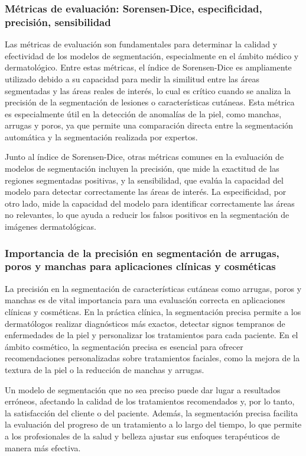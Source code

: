 \subsubsection{Métricas de evaluación: Sorensen-Dice, especificidad, precisión, sensibilidad}
Las métricas de evaluación son fundamentales para determinar la calidad y efectividad de los modelos de segmentación, especialmente en el ámbito médico y dermatológico. Entre estas métricas, el índice de Sorensen-Dice es ampliamente utilizado debido a su capacidad para medir la similitud entre las áreas segmentadas y las áreas reales de interés, lo cual es crítico cuando se analiza la precisión de la segmentación de lesiones o características cutáneas. Esta métrica es especialmente útil en la detección de anomalías de la piel, como manchas, arrugas y poros, ya que permite una comparación directa entre la segmentación automática y la segmentación realizada por expertos.

Junto al índice de Sorensen-Dice, otras métricas comunes en la evaluación de modelos de segmentación incluyen la precisión, que mide la exactitud de las regiones segmentadas positivas, y la sensibilidad, que evalúa la capacidad del modelo para detectar correctamente las áreas de interés. La especificidad, por otro lado, mide la capacidad del modelo para identificar correctamente las áreas no relevantes, lo que ayuda a reducir los falsos positivos en la segmentación de imágenes dermatológicas. \parencite{sorensen1948}

\subsubsection{Importancia de la precisión en segmentación de arrugas, poros y manchas para aplicaciones clínicas y cosméticas}
La precisión en la segmentación de características cutáneas como arrugas, poros y manchas es de vital importancia para una evaluación correcta en aplicaciones clínicas y cosméticas. En la práctica clínica, la segmentación precisa permite a los dermatólogos realizar diagnósticos más exactos, detectar signos tempranos de enfermedades de la piel y personalizar los tratamientos para cada paciente. En el ámbito cosmético, la segmentación precisa es esencial para ofrecer recomendaciones personalizadas sobre tratamientos faciales, como la mejora de la textura de la piel o la reducción de manchas y arrugas.

Un modelo de segmentación que no sea preciso puede dar lugar a resultados erróneos, afectando la calidad de los tratamientos recomendados y, por lo tanto, la satisfacción del cliente o del paciente. Además, la segmentación precisa facilita la evaluación del progreso de un tratamiento a lo largo del tiempo, lo que permite a los profesionales de la salud y belleza ajustar sus enfoques terapéuticos de manera más efectiva. \parencite{chuchu2020}

